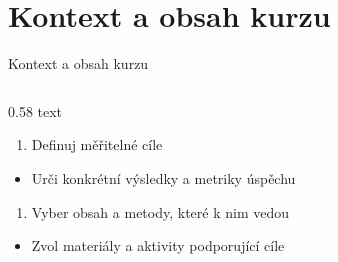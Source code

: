 \documentclass[aspectratio=169]{beamer}
\begin{document}
\section{Kontext a obsah kurzu}
\begin{frame}{Kontext a obsah kurzu}
\begin{columns}[T,onlytextwidth]
\begin{column}{0.58\textwidth}
\scriptsize
text


\begin{enumerate}

\def\labelenumi{\arabic{enumi})}

\tightlist

\item

  Definuj měřitelné cíle

\end{enumerate}


\begin{itemize}

\tightlist

\item

  Urči konkrétní výsledky a metriky úspěchu

\end{itemize}


\begin{enumerate}

\def\labelenumi{\arabic{enumi})}

\setcounter{enumi}{1}

\tightlist

\item

  Vyber obsah a metody, které k nim vedou

\end{enumerate}


\begin{itemize}

\tightlist

\item

  Zvol materiály a aktivity podporující cíle

\end{itemize}


\begin{enumerate}

\def\labelenumi{\arabic{enumi})}

\setcounter{enumi}{2}

\tightlist


\end{enumerate}
\end{column}
\end{columns}
\end{frame}
\end{document}
